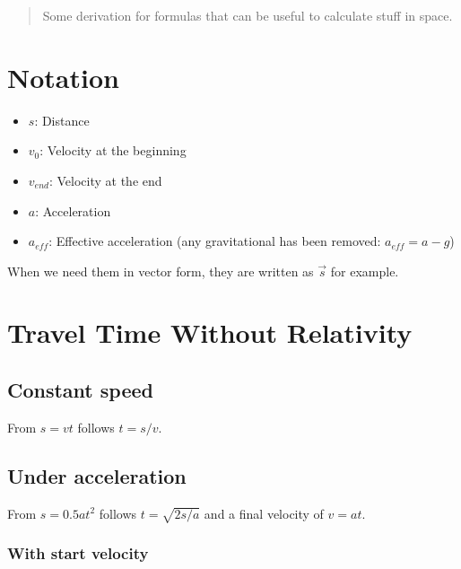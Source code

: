 \documentclass[10pt]{article}
\begin{document}
	\maketitle
	\newpage
	
	\tableofcontents
	\newpage
	
	\begin{abstract}
		Some derivation for formulas that can be useful to calculate stuff in space.
	\end{abstract}
	
	\section{Notation}
	
	\begin{itemize}
		\item $s$: Distance
		\item $v_0$: Velocity at the beginning
		\item $v_{end}$: Velocity at the end
		\item $a$: Acceleration
		\item $a_{eff}$: Effective acceleration (any gravitational has been removed: $a_{eff} = a - g$)
	\end{itemize}
	
	When we need them in vector form, they are written as $\vec{s}$ for example.
	
	\section{Travel Time Without Relativity}\label{TravelTime}
	
	\subsection{Constant speed}
	
	From $s = vt$ follows $t = s/v$.
	
	\subsection{Under acceleration}
	
	From $s = 0.5at^2$ follows $t = \sqrt{2s/a}$ and a final velocity of $v=at$.
	
	\subsubsection{With start velocity}
	
\end{document}
